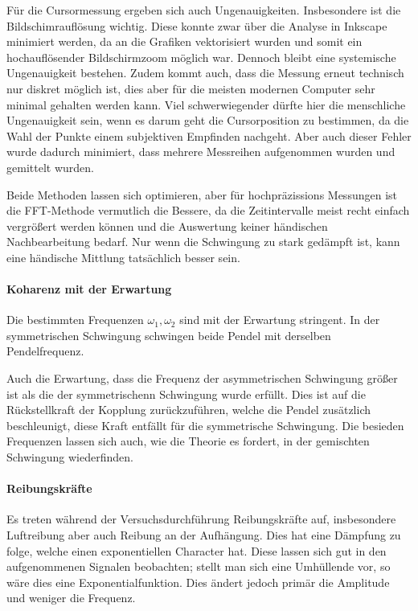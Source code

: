 Für die Cursormessung ergeben sich auch Ungenauigkeiten. Insbesondere ist die Bildschimrauflösung wichtig. Diese konnte zwar über die Analyse in Inkscape minimiert werden, da an die Grafiken vektorisiert wurden und somit ein hochauflösender Bildschirmzoom möglich war. Dennoch bleibt eine systemische Ungenauigkeit bestehen. Zudem kommt auch, dass die Messung erneut technisch nur diskret möglich ist, dies aber für die meisten modernen Computer sehr minimal gehalten werden kann. Viel schwerwiegender dürfte hier die menschliche Ungenauigkeit sein, wenn es darum geht die Cursorposition zu bestimmen, da die Wahl der Punkte einem subjektiven Empfinden nachgeht.
Aber auch dieser Fehler wurde dadurch minimiert, dass mehrere Messreihen aufgenommen wurden und gemittelt wurden. 

Beide Methoden lassen sich optimieren, aber für hochpräzissions Messungen ist die FFT-Methode vermutlich die Bessere, da die Zeitintervalle meist recht einfach vergrößert werden können und die Auswertung keiner händischen Nachbearbeitung bedarf. Nur wenn die Schwingung zu stark gedämpft ist, kann eine händische Mittlung tatsächlich besser sein. 

\paragraph{Koharenz mit der Erwartung}
Die bestimmten Frequenzen $\omega_1, \omega_2$ sind mit der Erwartung stringent. In der symmetrischen Schwingung schwingen beide Pendel mit derselben Pendelfrequenz.

Auch die Erwartung, dass die Frequenz der asymmetrischen Schwingung größer ist als die der symmetrischenn Schwingung wurde erfüllt. Dies ist auf die Rückstellkraft der Kopplung zurückzuführen, welche die Pendel zusätzlich beschleunigt, diese Kraft entfällt für die symmetrische Schwingung.
Die besieden Frequenzen lassen sich auch, wie die Theorie es fordert, in der gemischten Schwingung wiederfinden.

\paragraph{Reibungskräfte}
Es treten während der Versuchsdurchführung Reibungskräfte auf, insbesondere Luftreibung aber auch Reibung an der Aufhängung. Dies hat eine Dämpfung zu folge, welche einen exponentiellen Character hat. Diese lassen sich gut in den aufgenommenen Signalen beobachten; stellt man sich eine Umhüllende vor, so wäre dies eine Exponentialfunktion. Dies ändert jedoch primär die Amplitude und weniger die Frequenz.

